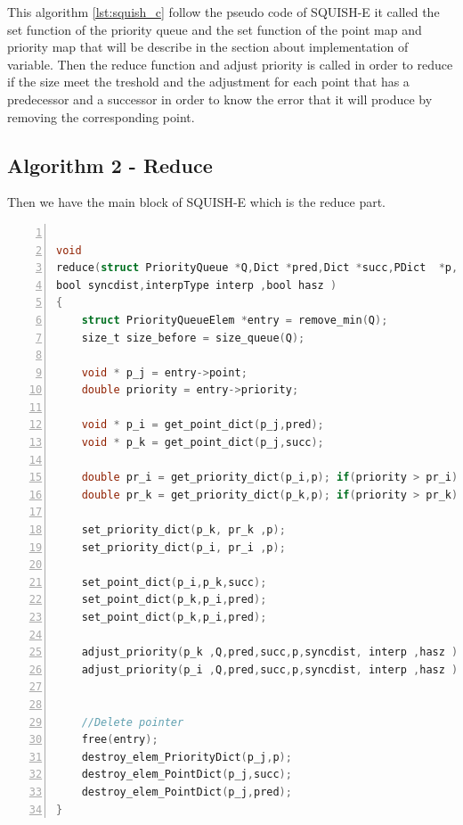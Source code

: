 This algorithm \ref{lst:squish_c} follow the pseudo code of SQUISH-E it called the set function of the priority queue and the set function of the point map and priority map that will be describe in the section about implementation of variable. Then the reduce function and adjust priority is called in order to reduce if the size meet the treshold and the adjustment for each point that has a predecessor and a successor in order to know the error that it will produce by removing the corresponding point.

\subsection{Algorithm 2 - Reduce}
Then we have the main block of SQUISH-E which is the reduce part.

\begin{lstlisting}[language=C, % Spécifie le langage du code
caption={reduce}, % Légende du listing
label=lst:reduce_c, % Étiquette pour référencer le listing
numbers=left,
numberstyle=\tiny\color{gray},
stepnumber=1,
frame=single,
breaklines=true,
postbreak=\mbox{\textcolor{red}{$\hookrightarrow$}\space},
showstringspaces=false,
float,
floatplacement=H
]

void
reduce(struct PriorityQueue *Q,Dict *pred,Dict *succ,PDict  *p,
bool syncdist,interpType interp ,bool hasz )
{
	struct PriorityQueueElem *entry = remove_min(Q);
	size_t size_before = size_queue(Q);
	
	void * p_j = entry->point;
	double priority = entry->priority;
	
	void * p_i = get_point_dict(p_j,pred);
	void * p_k = get_point_dict(p_j,succ);
	
	double pr_i = get_priority_dict(p_i,p); if(priority > pr_i){ pr_i = priority; }
	double pr_k = get_priority_dict(p_k,p); if(priority > pr_k){ pr_k = priority; }
	
	set_priority_dict(p_k, pr_k ,p);
	set_priority_dict(p_i, pr_i ,p);
	
	set_point_dict(p_i,p_k,succ);
	set_point_dict(p_k,p_i,pred);
	set_point_dict(p_k,p_i,pred);
	
	adjust_priority(p_k ,Q,pred,succ,p,syncdist, interp ,hasz );
	adjust_priority(p_i ,Q,pred,succ,p,syncdist, interp ,hasz );
	
	
	//Delete pointer
	free(entry);
	destroy_elem_PriorityDict(p_j,p);
	destroy_elem_PointDict(p_j,succ);
	destroy_elem_PointDict(p_j,pred);
}

\end{lstlisting}

